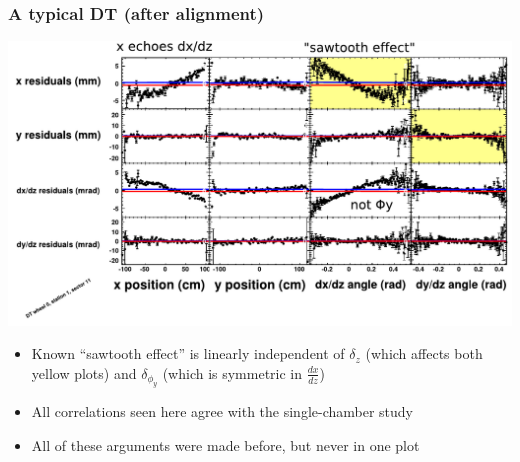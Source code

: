 \documentclass[compress]{beamer}
\begin{document}
\begin{frame}
\frametitle{A typical DT (after alignment)}

\vspace{0.25 cm}
\includegraphics[width=\linewidth]{datafit_sawtooth.pdf}

\vspace{-0.5 cm}
\begin{itemize}
\item Known ``sawtooth effect'' is linearly independent of
  $\delta_z$ (which affects both yellow plots) and
  $\delta_{\phi_y}$ (which is symmetric in $\frac{dx}{dz}$)
\item All correlations seen here agree with the single-chamber study
\item All of these arguments were made before, but never in one plot
\end{itemize}
\end{frame}
\end{document}
